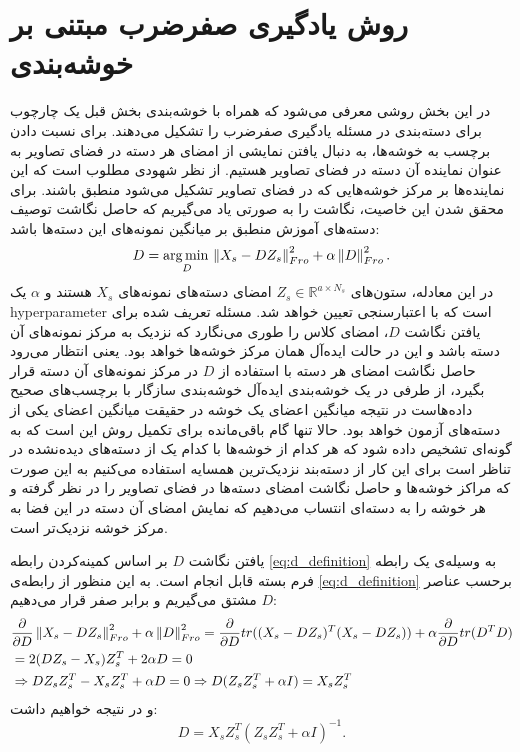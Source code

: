 \section{روش یادگیری صفرضرب مبتنی بر خوشه‌بندی} \label{simple_method}
در این بخش روشی معرفی می‌شود که همراه با خوشه‌بندی بخش قبل یک چارچوب برای دسته‌بندی در مسئله یادگیری صفرضرب را تشکیل می‌دهند. برای نسبت دادن برچسب به خوشه‌ها، به دنبال یافتن نمایشی از امضای هر دسته در فضای تصاویر به عنوان نماینده آن دسته در فضای تصاویر هستیم. از نظر شهودی مطلوب است که این نماینده‌ها بر مرکز خوشه‌هایی که در فضای تصاویر تشکیل می‌شود منطبق باشند. برای محقق شدن این خاصیت، نگاشت را به صورتی یاد می‌گیریم که حاصل نگاشت توصیف دسته‌های آموزش منطبق بر میانگین نمونه‌های این دسته‌ها باشد:
\begin{equation} \label{eq:d_definition}
  D = \operatorname*{arg\,min\,}_D \left \lVert X_s - D Z_s \right \rVert_{Fro}^2 + \alpha \left \lVert D \right \rVert_{Fro}^2.
\end{equation}
در این معادله، ستون‌های
 $Z_s \in \mathbb{R}^{a \times N_s}$
  امضای دسته‌های نمونه‌های $X_s$ هستند و $\alpha$ یک \gls{hyperparameter} است که با اعتبارسنجی تعیین خواهد شد. مسئله تعریف شده برای یافتن نگاشت $D$، امضای کلاس را طوری می‌نگارد که نزدیک به مرکز نمونه‌های آن دسته باشد و این در حالت ایده‌آل همان مرکز خوشه‌ها خواهد بود. یعنی انتظار می‌رود
  حاصل نگاشت امضای هر دسته با استفاده از $D$ در مرکز نمونه‌های آن دسته قرار بگیرد، از طرفی در یک خوشه‌بندی ایده‌آل خوشه‌بندی سازگار با برچسب‌های صحیح داده‌هاست در نتیجه میانگین اعضای یک خوشه در حقیقت میانگین اعضای یکی از دسته‌های آزمون خواهد بود. حالا تنها گام باقی‌مانده برای تکمیل روش این است که به گونه‌ای تشخیص داده شود که هر کدام از خوشه‌ها با کدام یک از دسته‌های دیده‌نشده در تناظر است برای این کار از دسته‌بند نزدیک‌ترین همسایه استفاده می‌کنیم به این صورت که مراکز خوشه‌ها و حاصل نگاشت امضای دسته‌ها در فضای تصاویر را در نظر گرفته و هر خوشه را به دسته‌ای انتساب می‌دهیم که نمایش  امضای آن دسته در این فضا به مرکز خوشه نزدیک‌تر است.

یافتن نگاشت $D$ بر اساس  کمینه‌کردن رابطه
  \eqref{eq:d_definition}
  به وسیله‌ی یک رابطه فرم بسته قابل انجام است.
  به این منظور از رابطه‌ی \eqref{eq:d_definition} برحسب عناصر $D$ مشتق می‌گیریم و برابر صفر قرار می‌دهیم:
  \begin{align*}
  &\frac{\partial}{\partial D} \left \lVert X_s - D Z_s \right \rVert_{Fro}^2 + \alpha \left \lVert D \right \rVert_{Fro}^2 =
    \frac{\partial} {\partial D}tr((X_s -DZ_s)^T (X_s-DZ_s)) + \alpha \frac{\partial}{\partial D}tr(D^TD) \\
& = 2(DZ_s - X_s)Z_s^T + 2 \alpha D =0 \\
&\Rightarrow  DZ_sZ_s^T -  X_sZ_s^T + \alpha D =0 \Rightarrow D(Z_sZ_s^T + \alpha I) =  X_sZ_s^T
  \end{align*}
  و در نتیجه خواهیم داشت:
  \begin{equation} \label{eq:d_answer}
  D = X_s Z_s^T (Z_s Z_s^T + \alpha I)^{-1}.
\end{equation}

